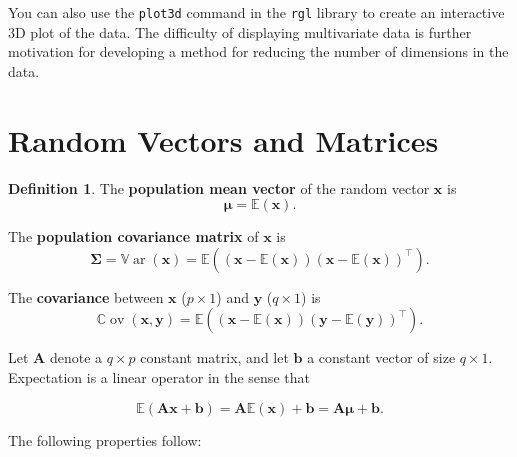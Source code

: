 \documentclass[]{book}
\theoremstyle{definition}
\newtheorem{definition}{Definition}[chapter]
\theoremstyle{definition}
\theoremstyle{definition}
\theoremstyle{remark}
\begin{document}
You can also use the \texttt{plot3d} command in the \texttt{rgl} library to create an interactive 3D plot of the data. The difficulty of displaying multivariate data is further motivation for developing a method for reducing the number of dimensions in the data.

\hypertarget{random-vectors-and-matrices}{%
\section{Random Vectors and Matrices}\label{random-vectors-and-matrices}}

\begin{definition}
\protect\hypertarget{def:popmean}{}{\label{def:popmean} }The \textbf{population mean vector} of the random vector \(\boldsymbol x\) is
\[\boldsymbol \mu= {\mathbb{E}}(\boldsymbol x).\]

The \textbf{population covariance matrix} of \(\boldsymbol x\) is
\[ \boldsymbol \Sigma= {\mathbb{V}\operatorname{ar}}(\boldsymbol x) = {\mathbb{E}}\left((\boldsymbol x-{\mathbb{E}}(\boldsymbol x))(\boldsymbol x-{\mathbb{E}}(\boldsymbol x))^\top \right).\]

The \textbf{covariance} between \(\boldsymbol x\) (\(p \times 1\)) and \(\boldsymbol y\) (\(q \times 1\)) is
\[ {\mathbb{C}\operatorname{ov}}(\boldsymbol x,\boldsymbol y) = {\mathbb{E}}\left((\boldsymbol x- {\mathbb{E}}(\boldsymbol x))(\boldsymbol y- {\mathbb{E}}(\boldsymbol y))^\top \right). \]
\end{definition}

Let \(\boldsymbol A\) denote a \(q \times p\) constant matrix, and let \(\boldsymbol b\) a constant vector of size \(q \times 1\).
Expectation is a linear operator in the sense that

\[{\mathbb{E}}(\boldsymbol A\boldsymbol x+ \boldsymbol b) = \boldsymbol A{\mathbb{E}}(\boldsymbol x) + \boldsymbol b=\boldsymbol A\boldsymbol \mu+\boldsymbol b.\]

The following properties follow:
\end{document}
